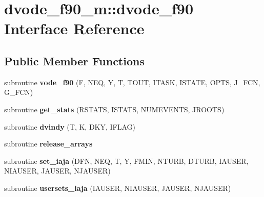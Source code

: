 \hypertarget{interfacedvode__f90__m_1_1dvode__f90}{}\section{dvode\+\_\+f90\+\_\+m\+:\+:dvode\+\_\+f90 Interface Reference}
\label{interfacedvode__f90__m_1_1dvode__f90}
\subsection*{Public Member Functions}
\begin{DoxyCompactItemize}
\item 
\mbox{\label{interfacedvode__f90__m_1_1dvode__f90_a4f6f79cb625da6c124fc7423939c239c}} 
subroutine {\bfseries vode\+\_\+f90} (F, N\+EQ, Y, T, T\+O\+UT, I\+T\+A\+SK, I\+S\+T\+A\+TE, O\+P\+TS, J\+\_\+\+F\+CN, G\+\_\+\+F\+CN)
\item 
\mbox{\label{interfacedvode__f90__m_1_1dvode__f90_aa5fa2c61d1b502a19e8c2a19305d99f8}} 
subroutine {\bfseries get\+\_\+stats} (R\+S\+T\+A\+TS, I\+S\+T\+A\+TS, N\+U\+M\+E\+V\+E\+N\+TS, J\+R\+O\+O\+TS)
\item 
\mbox{\label{interfacedvode__f90__m_1_1dvode__f90_aa9e3eb203265c91a924ab5ccd2579012}} 
subroutine {\bfseries dvindy} (T, K, D\+KY, I\+F\+L\+AG)
\item 
\mbox{\label{interfacedvode__f90__m_1_1dvode__f90_a665e5db313a9236bee20be06dce0e17e}} 
subroutine {\bfseries release\+\_\+arrays}
\item 
\mbox{\label{interfacedvode__f90__m_1_1dvode__f90_a1ecdbe3ecdd01e8c44092fc6d8670812}} 
subroutine {\bfseries set\+\_\+iaja} (D\+FN, N\+EQ, T, Y, F\+M\+IN, N\+T\+U\+RB, D\+T\+U\+RB, I\+A\+U\+S\+ER, N\+I\+A\+U\+S\+ER, J\+A\+U\+S\+ER, N\+J\+A\+U\+S\+ER)
\item 
\mbox{\label{interfacedvode__f90__m_1_1dvode__f90_a9beaea733b3803265ba645ce4c0ff5db}} 
subroutine {\bfseries usersets\+\_\+iaja} (I\+A\+U\+S\+ER, N\+I\+A\+U\+S\+ER, J\+A\+U\+S\+ER, N\+J\+A\+U\+S\+ER)

\end{DoxyCompactItemize}

